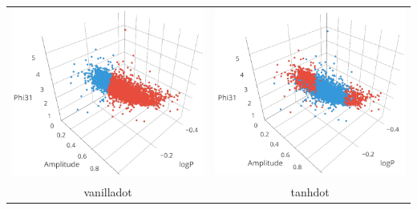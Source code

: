 \begin{longtable}{ c c }
	\includegraphics[width=0.3\paperwidth]{images/ksvm_vanilladot.png} & \includegraphics[width=0.3\paperwidth]{images/ksvm_tanhdot.png} \\
	vanilladot & tanhdot \\

\end{longtable}
